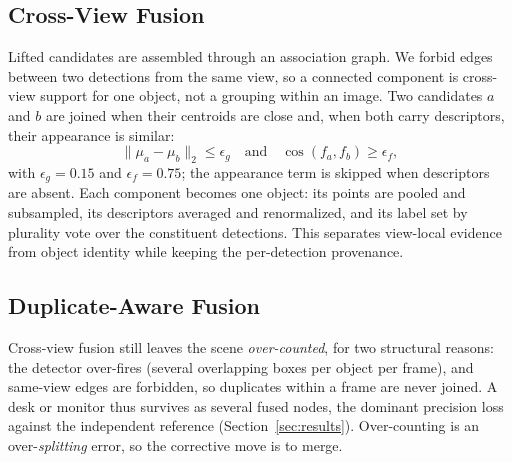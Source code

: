 \subsection{Cross-View Fusion}
\label{sec:fusion}

Lifted candidates are assembled through an association graph. We forbid edges between two detections from
the same view, so a connected component is cross-view support for one object, not a grouping within an
image. Two candidates $a$ and $b$ are joined when their centroids are close and, when both carry
descriptors, their appearance is similar:
\begin{equation}
    \|\mu_a-\mu_b\|_2 \leq \epsilon_g
    \quad\text{and}\quad
    \cos(f_a,f_b) \geq \epsilon_f ,
\end{equation}
with $\epsilon_g=0.15$ and $\epsilon_f=0.75$; the appearance term is skipped when descriptors are absent.
Each component becomes one object: its points are pooled and subsampled, its descriptors averaged and
renormalized, and its label set by plurality vote over the constituent detections. This separates
view-local evidence from object identity while keeping the per-detection provenance.

\subsection{Duplicate-Aware Fusion}
\label{sec:dedup}

Cross-view fusion still leaves the scene \emph{over-counted}, for two structural reasons: the detector
over-fires (several overlapping boxes per object per frame), and same-view edges are forbidden, so
duplicates within a frame are never joined. A desk or monitor thus survives as several fused nodes, the
dominant precision loss against the independent reference (Section~\ref{sec:results}). Over-counting is an
over-\emph{splitting} error, so the corrective move is to merge.

